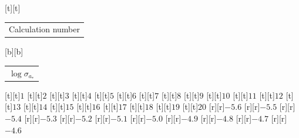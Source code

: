 %    
%
%
\begin{psfrags}%
\psfragscanon%
%
[t][t]{\color[rgb]{0,0,0}\setlength{\tabcolsep}{0pt}\begin{tabular}{c}{\Large{}Calculation number}\end{tabular}}%
[b][b]{\color[rgb]{0,0,0}\setlength{\tabcolsep}{0pt}\begin{tabular}{c}{\Large$\log \sigma_{a_\ast}$}\end{tabular}}%
%
[t][t]{$1$}%
[t][t]{$2$}%
[t][t]{$3$}%
[t][t]{$4$}%
[t][t]{$5$}%
[t][t]{$6$}%
[t][t]{$7$}%
[t][t]{$8$}%
[t][t]{$9$}%
[t][t]{$10$}%
[t][t]{$11$}%
[t][t]{$12$}%
[t][t]{$13$}%
[t][t]{$14$}%
[t][t]{$15$}%
[t][t]{$16$}%
[t][t]{$17$}%
[t][t]{$18$}%
[t][t]{$19$}%
[t][t]{$20$}%
%
[r][r]{$-5.6$}%
[r][r]{$-5.5$}%
[r][r]{$-5.4$}%
[r][r]{$-5.3$}%
[r][r]{$-5.2$}%
[r][r]{$-5.1$}%
[r][r]{$-5.0$}%
[r][r]{$-4.9$}%
[r][r]{$-4.8$}%
[r][r]{$-4.7$}%
[r][r]{$-4.6$}%
%
%
\end{psfrags}%
%
